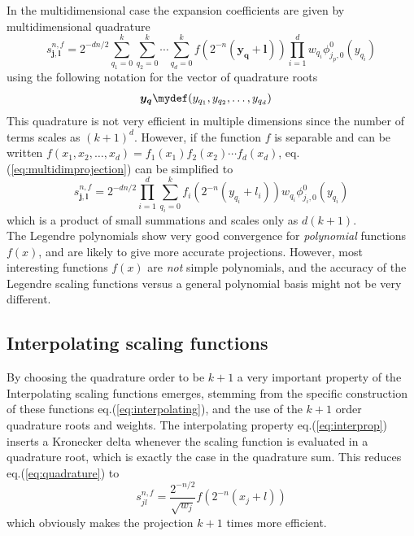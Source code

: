 \noindent
In the multidimensional case the expansion coefficients are given by
multidimensional quadrature
\begin{equation}
	\label{eq:multidimprojection}
	s^{n,f}_{\boldsymbol{j},\boldsymbol{l}} = 2^{-dn/2}
	\sum_{q_1=0}^{k}\sum_{q_2=0}^{k}\cdots\sum_{q_d=0}^{k}
	f(2^{-n}(\boldsymbol{y_q}+\boldsymbol{l}))
	\prod_{i=1}^d w_{q_i}\phi_{j_p,0}^0(y_{q_i})
\end{equation}
using the following notation for the vector of quadrature roots
\begin{align}
		\boldsymbol{y_q} &\mydef (y_{q_1},y_{q_2},\dots,y_{q_d})
\end{align}
This quadrature is
not very efficient in multiple dimensions since the
number of terms scales as $(k+1)^d$. However, if the function $f$ is 
separable and can be written $f(x_1,x_2,\dots,x_d) = 
f_1(x_1)f_2(x_2)\cdots f_d(x_d)$, eq.(\ref{eq:multidimprojection}) can be 
simplified to
\begin{equation}
	s^{n,f}_{\boldsymbol{j},\boldsymbol{l}} = 2^{-dn/2}\prod_{i=1}^d
	\sum_{q_i=0}^{k}f_i(2^{-n}(y_{q_i}+l_i))
	w_{q_i}\phi^0_{j_i,0}(y_{q_i})
\end{equation}
which is a product of small summations and scales only as $d(k+1)$.\\

\noindent
The Legendre polynomials show very good 
convergence for \emph{polynomial} functions $f(x)$, and are likely to give more
accurate projections. However, most interesting functions $f(x)$ are \emph{not}
simple polynomials, and the accuracy of the Legendre scaling functions versus a 
general polynomial basis might not be very different.\\

\subsection*{Interpolating scaling functions}
By choosing the quadrature order to be $k+1$ a very important property of the
Interpolating scaling functions emerges, stemming from the specific 
construction of these functions eq.(\ref{eq:interpolating}), and the use of the 
$k+1$ order quadrature roots and weights. The interpolating property
eq.(\ref{eq:interprop}) inserts a Kronecker delta whenever the scaling function
is evaluated in a quadrature root, which is exactly the case in the quadrature
sum. This reduces eq.(\ref{eq:quadrature}) to
\begin{equation}
	s_{jl}^{n,f} = \frac{2^{-n/2}}{\sqrt{w_j}}f(2^{-n}(x_j+l))
\end{equation}
which obviously makes the projection $k+1$ times more efficient.\\

